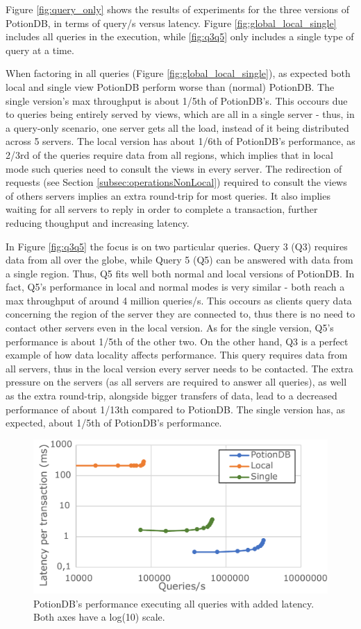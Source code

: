 \documentclass[sigplan,10pt]{acmart}
\begin{document}
Figure \ref{fig:query_only} shows the results of experiments for the three versions of PotionDB, in terms of query/s versus latency.
Figure \ref{fig:global_local_single} includes all queries in the execution, while \ref{fig:q3q5} only includes a single type of query at a time.

When factoring in all queries (Figure \ref{fig:global_local_single}), as expected both local and single view PotionDB perform worse than (normal) PotionDB.
The single version's max throughput is about 1/5th of PotionDB's.
This occours due to queries being entirely served by views, which are all in a single server - thus, in a query-only scenario, one server gets all the load, instead of it being distributed across 5 servers.
The local version has about 1/6th of PotionDB's performance, as 2/3rd of the queries require data from all regions, which implies that in local mode such queries need to consult the views in every server.
The redirection of requests (see Section \ref{subsec:operationsNonLocal}) required to consult the views of others servers implies an extra round-trip for most queries. It also implies waiting for all servers to reply in order to complete a transaction, further reducing thoughput and increasing latency.

In Figure \ref{fig:q3q5} the focus is on two particular queries. Query 3 (Q3) requires data from all over the globe, while Query 5 (Q5) can be answered with data from a single region.
Thus, Q5 fits well both normal and local versions of PotionDB.
In fact, Q5's performance in local and normal modes is very similar - both reach a max throughput of around 4 million queries/s.
This occours as clients query data concerning the region of the server they are connected to, thus there is no need to contact other servers even in the local version.
As for the single version, Q5's performance is about 1/5th of the other two.
On the other hand, Q3 is a perfect example of how data locality affects performance.
This query requires data from all servers, thus in the local version every server needs to be contacted. The extra pressure on the servers (as all servers are required to answer all queries), as well as the extra round-trip, alongside bigger transfers of data, lead to a decreased performance of about 1/13th compared to PotionDB.
The single version has, as expected, about 1/5th of PotionDB's performance.

\begin{figure}
	\centering
	\includegraphics[width=.75\linewidth]{clientScale_tc_cut}
	\caption{PotionDB's performance executing all queries with added latency. Both axes have a log(10) scale.}
	\label{fig:global_local_single_tc}
\end{figure}
\end{document}

